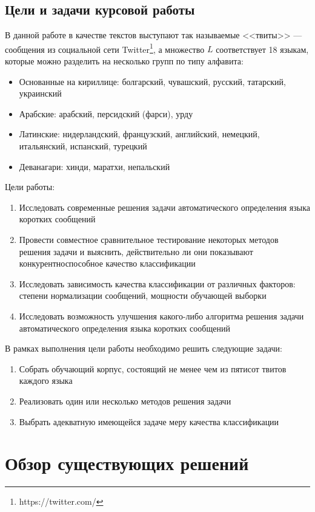 \documentclass[a4paper, 14pt]{article}
\begin{document}
		\subsection{Цели и задачи курсовой работы}
		В данной работе в качестве текстов выступают так называемые <<твиты>> --- сообщения из социальной сети Twitter\footnote{https://twitter.com/}, 
		а множество $L$ соответствует 18 языкам, которые можно разделить на несколько групп по типу алфавита:
		\begin{itemize}
			\item Основанные на кириллице: болгарский, чувашский, русский, татарский, украинский
			\item Арабские: арабский, персидский (фарси), урду
			\item Латинские: нидерландский, французский, английский, немецкий, итальянский, испанский, турецкий
			\item Деванагари: хинди, маратхи, непальский
		\end{itemize}
		Цели работы:
		\begin{enumerate}
			\item Исследовать современные решения задачи автоматического определения языка коротких сообщений
			\item Провести совместное сравнительное тестирование некоторых методов решения задачи и выяснить, действительно ли они показывают
			конкурентноспособное качество классификации
			\item Исследовать зависимость качества классификации от различных факторов: степени нормализации сообщений, мощности обучающей 
			выборки
			\item Исследовать возможность улучшения какого-либо алгоритма решения задачи автоматического определения языка коротких сообщений	
		\end{enumerate}
		В рамках выполнения цели работы необходимо решить следующие задачи:
		\begin{enumerate}
			\item Собрать обучающий корпус, состоящий не менее чем из пятисот твитов каждого языка
			\item Реализовать один или несколько методов решения задачи
			\item Выбрать адекватную имеющейся задаче меру качества классификации
		\end{enumerate}

\section{Обзор существующих решений}
\end{document}
